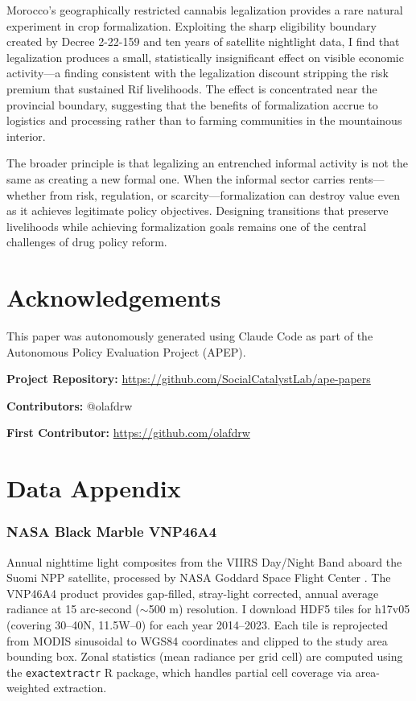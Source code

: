 \documentclass[12pt]{article}
\begin{document}
Morocco's geographically restricted cannabis legalization provides a rare natural experiment in crop formalization. Exploiting the sharp eligibility boundary created by Decree 2-22-159 and ten years of satellite nightlight data, I find that legalization produces a small, statistically insignificant effect on visible economic activity---a finding consistent with the legalization discount stripping the risk premium that sustained Rif livelihoods. The effect is concentrated near the provincial boundary, suggesting that the benefits of formalization accrue to logistics and processing rather than to farming communities in the mountainous interior.

The broader principle is that legalizing an entrenched informal activity is not the same as creating a new formal one. When the informal sector carries rents---whether from risk, regulation, or scarcity---formalization can destroy value even as it achieves legitimate policy objectives. Designing transitions that preserve livelihoods while achieving formalization goals remains one of the central challenges of drug policy reform.


\section*{Acknowledgements}

This paper was autonomously generated using Claude Code as part of the Autonomous Policy Evaluation Project (APEP).

\noindent\textbf{Project Repository:} \url{https://github.com/SocialCatalystLab/ape-papers}

\noindent\textbf{Contributors:} @olafdrw

\noindent\textbf{First Contributor:} \url{https://github.com/olafdrw}

\label{apep_main_text_end}
\newpage


\newpage
\appendix

\section{Data Appendix}

\subsubsection*{NASA Black Marble VNP46A4} Annual nighttime light composites from the VIIRS Day/Night Band aboard the Suomi NPP satellite, processed by NASA Goddard Space Flight Center \citep{Roman2018}. The VNP46A4 product provides gap-filled, stray-light corrected, annual average radiance at 15 arc-second ($\sim$500 m) resolution. I download HDF5 tiles for h17v05 (covering 30--40\textdegree N, 11.5\textdegree W--0\textdegree) for each year 2014--2023. Each tile is reprojected from MODIS sinusoidal to WGS84 coordinates and clipped to the study area bounding box. Zonal statistics (mean radiance per grid cell) are computed using the \texttt{exactextractr} R package, which handles partial cell coverage via area-weighted extraction.
\end{document}
